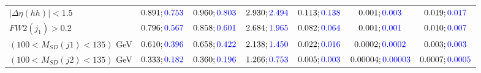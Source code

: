 \begin{landscape}
\begin{table}
\begin{tabular}{lcccccc}
			\rowcolor{black!7}$|\Delta\eta(hh)|<1.5$& $0.891;\textcolor{blue}{0.753}$&$0.960;\textcolor{blue}{0.803}$ &$2.930;\textcolor{blue}{2.494}$ &$0.113;\textcolor{blue}{0.138}$ &$0.001;\textcolor{blue}{0.003}$ &$0.019;\textcolor{blue}{0.017}$\\
			$FW2(j_1)>0.2$ &$0.796;\textcolor{blue}{0.567}$ &$0.858;\textcolor{blue}{0.601}$&$2.684;\textcolor{blue}{1.965}$&$0.082;\textcolor{blue}{0.064}$&$0.001;\textcolor{blue}{0.001}$&$0.010;\textcolor{blue}{0.007}$\\
			\rowcolor{black!7}$(100<M_{SD}(j1)<135)$ GeV& $0.610;\textcolor{blue}{0.396}$&$0.658;\textcolor{blue}{0.422}$&$2.138;\textcolor{blue}{1.450}$&$0.022;\textcolor{blue}{0.016}$&$0.0002;\textcolor{blue}{0.0002}$&$0.003;\textcolor{blue}{0.003}$\\
			$(100<M_{SD}(j2)<135)$ GeV &$0.333;\textcolor{blue}{0.182}$ &$0.360;\textcolor{blue}{0.196}$ &$1.266;\textcolor{blue}{0.753}$&$0.005;\textcolor{blue}{0.003}$&$0.00004;\textcolor{blue}{0.00003}$&$0.0007;\textcolor{blue}{0.0005}$\\
			\bottomrule
		\end{tabular}
	\end{table}
	

\end{landscape}
